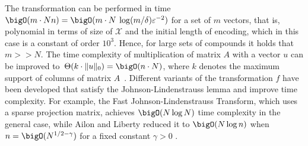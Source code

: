 The transformation can be performed in time \( \bigO(m \cdot Nn) = \bigO(m \cdot N \: \log(m/\delta)\eps^{-2}) \) for a set of \( m \) vectors, that is, polynomial in terms of size of \( \mathcal{X} \) and the initial length of encoding, which in this case is a constant of order \( 10^3 \). Hence, for large sets of compounds it holds that \( m >\!\!> N \). The time complexity of multiplication of matrix \( A \) with a vector \( u \) can be improved to~\( \Theta(k \cdot \| u \|_0) = \bigO(n \cdot N) \), where \( k \) denotes the maximum support of columns of matrix \( A \)~\cite{freksen2021jl}. Different variants of the transformation \( f \) have been developed that satisfy the Johnson-Lindenstrauss lemma and improve time complexity. For example, the Fast Johnson-Lindenstrauss Transform, which uses a sparse projection matrix, achieves \( \bigO(N \log N) \) time complexity in the general case, while Ailon and Liberty reduced it to \( \bigO(N \log n) \) when \( n = \bigO(N^{1/2 - \gamma}) \) for a fixed constant \( \gamma > 0 \) \cite{freksen2021jl}.


